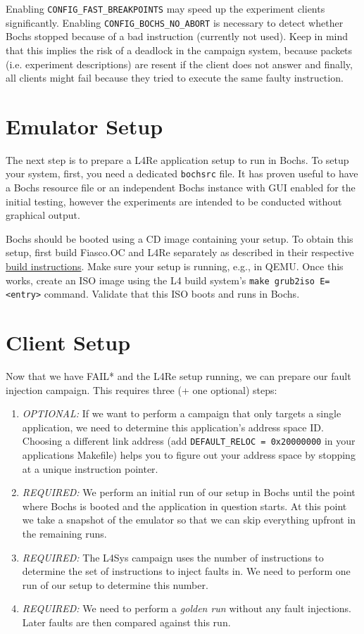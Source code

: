 \documentclass[a4paper,times,9pt]{article}
\newcommand{\lfs}{L4Sys}
\begin{document}
Enabling \verb+CONFIG_FAST_BREAKPOINTS+ may speed up the experiment clients
significantly. Enabling \verb+CONFIG_BOCHS_NO_ABORT+ is necessary to detect
whether Bochs stopped because of a bad instruction (currently not used).
Keep in mind that this implies the risk of a deadlock
in the campaign system, because packets (i.e. experiment descriptions)
are resent if the client does not answer and finally, all clients
might fail because they tried to execute the same faulty instruction.

\section{Emulator Setup}

The next step is to prepare a L4Re application setup to run in Bochs.  To
setup your system, first, you need a dedicated \texttt{bochsrc} file.  It has
proven useful to have a Bochs resource file or an independent Bochs instance
with GUI enabled for the initial testing, however the experiments are intended
to be conducted without graphical output.

Bochs should be booted using a CD image containing your setup. To obtain this
setup, first build Fiasco.OC and L4Re separately as described in their
respective \href{https://os.inf.tu-dresden.de/L4Re/build.html}{build
instructions}. Make sure your setup is running, e.g., in QEMU. Once this
works, create an ISO image using the L4 build system's 
\verb+make grub2iso E=<entry>+ command. Validate that this ISO boots and runs
in Bochs.


\section{Client Setup}

Now that we have FAIL* and the L4Re setup running, we can prepare our fault
injection campaign. This requires three (+ one optional) steps:
\begin{enumerate}[topsep=0em,itemsep=0em]
  \item \emph{OPTIONAL:} If we want to perform a campaign that only targets
        a single application, we need to determine this application's address
        space ID. Choosing a different link address (add
				\verb+DEFAULT_RELOC = 0x20000000+ in your applications Makefile)
				helps you to figure out your address space by stopping at a unique
				instruction pointer.
  \item \emph{REQUIRED:} We perform an initial run of our setup in Bochs until
        the point where Bochs is booted and the application in question
        starts. At this point we take a snapshot of the emulator so that we
        can skip everything upfront in the remaining runs.
  \item \emph{REQUIRED:} The \lfs{} campaign uses the number of instructions to
        determine the set of instructions to inject faults in. We need to
        perform one run of our setup to determine this number.
  \item \emph{REQUIRED:} We need to perform a \emph{golden run} without any
        fault injections. Later faults are then compared against this run.
\end{enumerate}
\end{document}
